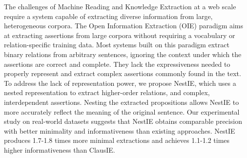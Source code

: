 The challenges of Machine Reading and Knowledge Extraction at a web scale require a system capable of extracting diverse information from large, heterogeneous corpora. The Open Information Extraction (OIE) paradigm aims at extracting assertions from large corpora without requiring a vocabulary or relation-specific training data. Most systems built on this paradigm extract binary relations from arbitrary sentences, ignoring the context under which the assertions are correct and complete. They lack the expressiveness needed to properly represent and extract complex assertions commonly found in the text. To address the lack of representation power, we propose NestIE, which uses a nested representation to extract higher-order relations, and complex, interdependent assertions. Nesting the extracted propositions allows NestIE to more accurately reflect the meaning of the original sentence. Our experimental study on real-world datasets suggests that NestIE obtains comparable precision with better minimality and informativeness than existing approaches. NestIE produces 1.7-1.8 times more minimal extractions and achieves 1.1-1.2 times higher informativeness than ClausIE.
